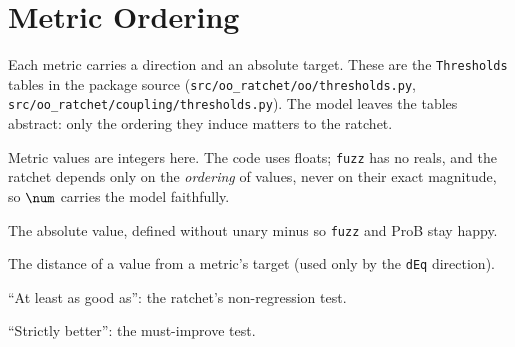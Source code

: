 \documentclass[a4paper,10pt,fleqn]{article}
\begin{document}
\section{Metric Ordering}

Each metric carries a direction and an absolute target. These are the
\texttt{Thresholds} tables in the package source
(\texttt{src/oo\_ratchet/oo/thresholds.py},
\texttt{src/oo\_ratchet/coupling/thresholds.py}). The model leaves the tables abstract:
only the ordering they induce matters to the ratchet.


Metric values are integers here. The code uses floats; \texttt{fuzz} has
no reals, and the ratchet depends only on the \emph{ordering} of values,
never on their exact magnitude, so $\num$ carries the model faithfully.

The absolute value, defined without unary minus so \texttt{fuzz} and ProB
stay happy.


The distance of a value from a metric's target (used only by the
\texttt{dEq} direction).


``At least as good as'': the ratchet's non-regression test.


``Strictly better'': the must-improve test.
\end{document}
